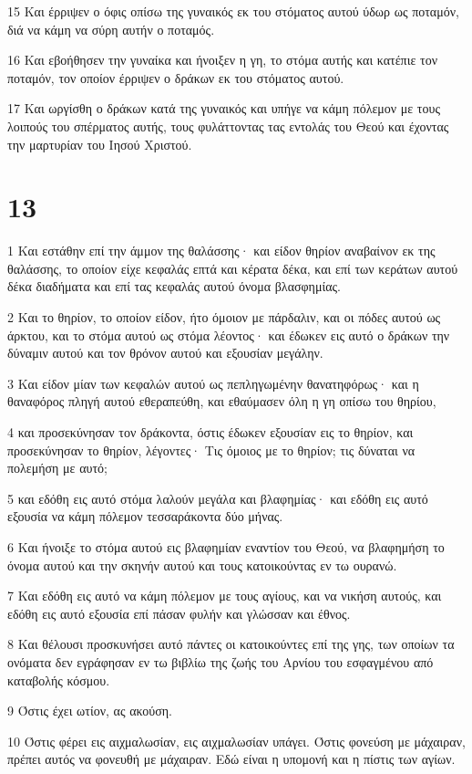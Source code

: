 \par 15 Και έρριψεν ο όφις οπίσω της γυναικός εκ του στόματος αυτού ύδωρ ως ποταμόν, διά να κάμη να σύρη αυτήν ο ποταμός.
\par 16 Και εβοήθησεν την γυναίκα και ήνοιξεν η γη, το στόμα αυτής και κατέπιε τον ποταμόν, τον οποίον έρριψεν ο δράκων εκ του στόματος αυτού.
\par 17 Και ωργίσθη ο δράκων κατά της γυναικός και υπήγε να κάμη πόλεμον με τους λοιπούς του σπέρματος αυτής, τους φυλάττοντας τας εντολάς του Θεού και έχοντας την μαρτυρίαν του Ιησού Χριστού.

\chapter{13}

\par 1 Και εστάθην επί την άμμον της θαλάσσης· και είδον θηρίον αναβαίνον εκ της θαλάσσης, το οποίον είχε κεφαλάς επτά και κέρατα δέκα, και επί των κεράτων αυτού δέκα διαδήματα και επί τας κεφαλάς αυτού όνομα βλασφημίας.
\par 2 Και το θηρίον, το οποίον είδον, ήτο όμοιον με πάρδαλιν, και οι πόδες αυτού ως άρκτου, και το στόμα αυτού ως στόμα λέοντος· και έδωκεν εις αυτό ο δράκων την δύναμιν αυτού και τον θρόνον αυτού και εξουσίαν μεγάλην.
\par 3 Και είδον μίαν των κεφαλών αυτού ως πεπληγωμένην θανατηφόρως· και η θαναφόρος πληγή αυτού εθεραπεύθη, και εθαύμασεν όλη η γη οπίσω του θηρίου,
\par 4 και προσεκύνησαν τον δράκοντα, όστις έδωκεν εξουσίαν εις το θηρίον, και προσεκύνησαν το θηρίον, λέγοντες· Τις όμοιος με το θηρίον; τις δύναται να πολεμήση με αυτό;
\par 5 και εδόθη εις αυτό στόμα λαλούν μεγάλα και βλαφημίας· και εδόθη εις αυτό εξουσία να κάμη πόλεμον τεσσαράκοντα δύο μήνας.
\par 6 Και ήνοιξε το στόμα αυτού εις βλαφημίαν εναντίον του Θεού, να βλαφημήση το όνομα αυτού και την σκηνήν αυτού και τους κατοικούντας εν τω ουρανώ.
\par 7 Και εδόθη εις αυτό να κάμη πόλεμον με τους αγίους, και να νικήση αυτούς, και εδόθη εις αυτό εξουσία επί πάσαν φυλήν και γλώσσαν και έθνος.
\par 8 Και θέλουσι προσκυνήσει αυτό πάντες οι κατοικούντες επί της γης, των οποίων τα ονόματα δεν εγράφησαν εν τω βιβλίω της ζωής του Αρνίου του εσφαγμένου από καταβολής κόσμου.
\par 9 Όστις έχει ωτίον, ας ακούση.
\par 10 Όστις φέρει εις αιχμαλωσίαν, εις αιχμαλωσίαν υπάγει. Όστις φονεύση με μάχαιραν, πρέπει αυτός να φονευθή με μάχαιραν. Εδώ είναι η υπομονή και η πίστις των αγίων.
